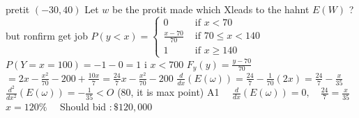 pretit $(-30,40)$
Let $w$ be the protit made
which Xleads to the hahnt $E(W)$ ?
but ronfirm get job
$P(y<x)=\left\{\begin{array}{ll}0 & \text { if } x<70 \\ \frac{x-70}{70} & \text { if } 70 \leqslant x<140 \\ 1 & \text { if } x \geqslant 140\end{array}\right.$
$P(Y=x=100)=-1-0=1$ i $x<700$
$F_{y}(y)=\frac{y-70}{70}$
$=2 x-\frac{x^{2}}{70}-200+\frac{10 x}{7}=\frac{24}{7} x-\frac{x^{2}}{70}-200$
$\frac{d}{d x}(E(\omega))=\frac{24}{7}-\frac{1}{70}(2 x)=\frac{24}{7}-\frac{x}{35}$
$\frac{d^{2}}{d x^{2}}(E(\omega))=-\frac{1}{35}<O$ (80, it is max point)
A1 $\quad \frac{d}{d x}(E(\omega))=0, \quad \frac{24}{7}=\frac{x}{35}$
$x=120 \% \quad$ Should bid $: \$ 120,000$